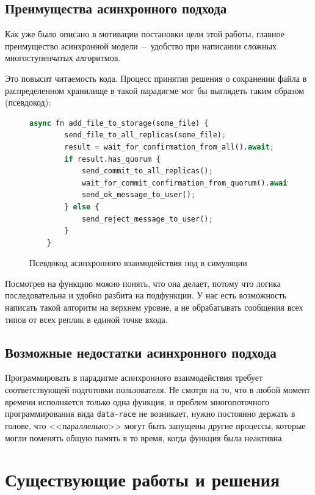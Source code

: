 \subsection{Преимущества асинхронного подхода}

Как уже было описано в мотивации постановки цели этой работы, главное преимущество асинхронной модели~--~удобство при написании сложных многоступенчатых алгоритмов.

Это повысит читаемость кода. Процесс принятия решения о сохранении файла в распределенном хранилище в такой парадигме мог бы выглядеть таким образом (псевдокод):

\begin{figure}[H]
\begin{lstlisting}[language=Python]
    async fn add_file_to_storage(some_file) {
        send_file_to_all_replicas(some_file);
        result = wait_for_confirmation_from_all().await;
        if result.has_quorum {
            send_commit_to_all_replicas();
            wait_for_commit_confirmation_from_quorum().await;
            send_ok_message_to_user();
        } else {
            send_reject_message_to_user();
        }
    }
\end{lstlisting}
\caption{Псевдокод асинхронного взаимодействия нод в симуляции}
\label{pseudocode}
\end{figure}

Посмотрев на функцию можно понять, что она делает, потому что логика последовательна и удобно разбита на подфункции. У нас есть возможность написать такой алгоритм на верхнем уровне, а не обрабатывать сообщения всех типов от всех реплик в единой точке входа.

\subsection{Возможные недостатки асинхронного подхода}

Программировать в парадигме асинхронного взаимодействия требует соответствующей подготовки пользователя. Не смотря на то, что в любой момент времени исполняется только одна функция, и проблем многопоточного программирования вида \texttt{data-race} не возникает, нужно постоянно держать в голове, что <<параллельно>> могут быть запущены другие процессы, которые могли поменять общую память в то время, когда функция была неактивна. 

\section{Существующие работы и решения}

